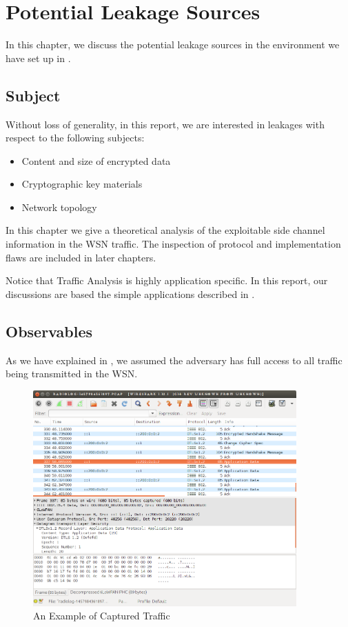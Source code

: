 \chapter{Potential Leakage Sources}

In this chapter, we discuss the potential leakage sources in the environment we have set up in . 

\section{Subject} \label{Sec: Subjects}

Without loss of generality, in this report, we are interested in leakages with respect to the following subjects:

\begin{itemize}
	\item Content and size of encrypted data
	\item Cryptographic key materials
	\item Network topology
\end{itemize}

In this chapter we give a theoretical analysis of the exploitable side channel information in the WSN traffic. The inspection of protocol and implementation flaws are included in later chapters.

Notice that Traffic Analysis is highly application specific. In this report, our discussions are based the simple applications described in . 

\section{Observables} \label{Sec: Observables}

As we have explained in , we assumed the adversary has full access to all traffic being transmitted in the WSN. 

\begin{figure}[h!]
	\center
	\includegraphics[width=0.9\textwidth]{fig/udpexample.png}
	\caption{An Example of Captured Traffic}
	\label{Fig: An Example of Captured Traffic}
\end{figure}

